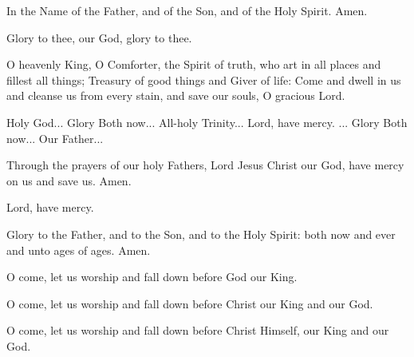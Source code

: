 In the Name of the Father, and of the Son, and of the Holy Spirit. Amen.

Glory to thee, our God, glory to thee.

O heavenly King, O Comforter, the Spirit of truth, who art in all places and fillest all things; Treasury of good things and Giver of life: Come and dwell in us and cleanse us from every stain, and save our souls, O gracious Lord.

Holy God... Glory  Both now... All-holy Trinity... Lord, have mercy. ... Glory  Both now... Our Father...

Through the prayers of our holy Fathers, Lord Jesus Christ our God, have mercy on us and save us. Amen.

Lord, have mercy. 

Glory to the Father, and to the Son, and to the Holy Spirit: both now and ever and unto ages of ages. Amen.

O come, let us worship and fall down before God our King. 

O come, let us worship and fall down before Christ our King and our God. 

O come, let us worship and fall down before Christ Himself, our King and our God. 
